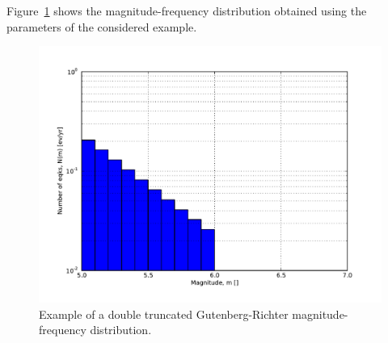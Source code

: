 \begin{description}
    Figure~\ref{fig:dt_gr_mfd} shows the magnitude-frequency distribution 
    obtained using the parameters of the considered example.
\begin{figure}[!ht]
\centering
\includegraphics[width=12cm]{figures/hazard/dt_mfd.pdf}
\caption{Example of a double truncated Gutenberg-Richter 
magnitude-frequency distribution.}
\label{fig:dt_gr_mfd}
\end{figure}
%
%

\end{description}
